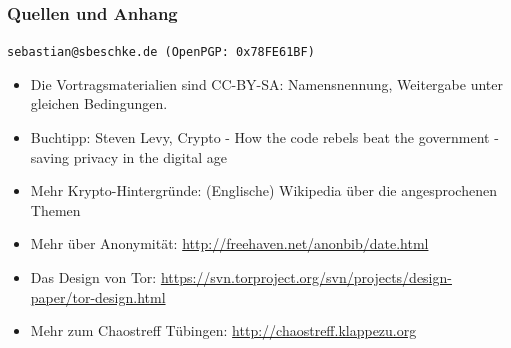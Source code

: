 \documentclass{beamer}
\begin{document}
\begin{frame}
\frametitle{Quellen und Anhang}

\texttt{sebastian@sbeschke.de (OpenPGP: 0x78FE61BF)}

\begin{itemize}
	\item Die Vortragsmaterialien sind CC-BY-SA: Namensnennung, Weitergabe unter gleichen Bedingungen.
	\item Buchtipp: Steven Levy, Crypto - How the code rebels beat the government - saving privacy in the digital age
	\item Mehr Krypto-Hintergründe: (Englische) Wikipedia über die angesprochenen Themen
	\item Mehr über Anonymität: \url{http://freehaven.net/anonbib/date.html}
	\item Das Design von Tor: \url{https://svn.torproject.org/svn/projects/design-paper/tor-design.html}
	\item Mehr zum Chaostreff Tübingen: \url{http://chaostreff.klappezu.org}
\end{itemize}

\end{frame}
\end{document}
